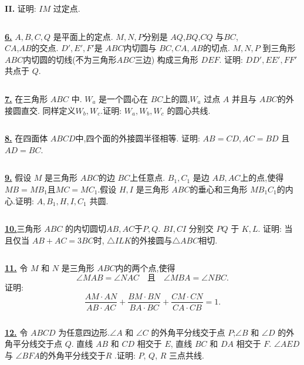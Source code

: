 \documentclass{article}
\begin{document}
{\bf II.} 证明: $ IM$ 过定点.

$$ $$

\href{http://www.artofproblemsolving.com/Forum/viewtopic.php?p=1385932#p1385932}{\bf 6.}  $ A,B,C,Q$ 是平面上的定点. $ M,N,P$分别是 $ AQ$,$BQ$,$CQ$ 与$ BC$,\\$CA$,$AB$的交点. $ D',E',F'$是 $ ABC$内切圆与 $ BC,CA,AB$的切点. $ M,N,P$ 到三角形 $ ABC$内切圆的切线(不为三角形$ ABC$三边) 构成三角形 $ DEF$. 证明: $ DD',EE',FF'$ 共点于 $ Q$.

$$ $$

\href{http://www.artofproblemsolving.com/Forum/viewtopic.php?p=1385593#p1385593}{\bf 7.} 在三角形 $ ABC$ 中. $ W_a$ 是一个圆心在 $ BC$上的圆,$ W_a$ 过点 $ A$ 并且与 $ ABC$的外接圆直交. 同样定义$ W_b,W_c$.证明: $ W_a,W_b,W_c$ 的圆心共线.

$$ $$

\href{http://www.artofproblemsolving.com/Forum/viewtopic.php?p=1385555#p1385555}{\bf 8.} 在四面体 $ABCD$中,四个面的外接圆半径相等. 证明: $AB=CD, AC=BD$ 且 $AD=BC$.

$$ $$

\href{http://www.artofproblemsolving.com/Forum/viewtopic.php?p=1385585#p1385585}{\bf 9.} 假设 $ M$ 是三角形 $ ABC$的边 $ BC$上任意点. $ B_1,C_1$ 是边 $ AB,AC$上的点,使得$ MB = MB_1$且$ MC = MC_1$.假设 $ H,I$ 是三角形 $ ABC$的垂心和三角形 $ MB_1C_1$的内心.证明: $ A,B_1,H,I,C_1$ 共圆.

$$ $$

\href{http://www.artofproblemsolving.com/Forum/viewtopic.php?p=1370723#p1370723}{\bf 10.}三角形 $ ABC$ 的内切圆切$ AB,AC$于$ P,Q$. $ BI, CI$ 分别交 $ PQ$ 于 $ K,L$. 证明: 当且仅当 $ AB+AC=3BC$时, $\triangle ILK$的外接圆与$\triangle ABC$相切.

$$ $$

\href{http://www.artofproblemsolving.com/Forum/viewtopic.php?p=124397#p124397}{\bf 11.} 令 $ M$ 和 $ N$ 是三角形 $ ABC$内的两个点,使得
$$ \angle MAB = \angle NAC\quad \mbox{且}\quad \angle MBA = \angle NBC.$$
证明:
$$ \frac {AM \cdot AN}{AB \cdot AC} + \frac {BM \cdot BN}{BA \cdot BC} + \frac {CM \cdot CN}{CA \cdot CB} = 1.$$

$$ $$

\href{http://www.artofproblemsolving.com/Forum/viewtopic.php?p=191489#p191489}{\bf 12.} 令 $ABCD$ 为任意四边形.$\angle A$ 和 $\angle C$ 的外角平分线交于点 $P$;$\angle B$ 和 $\angle D$ 的外角平分线交于点 $Q$. 直线 $AB$ 和 $CD$ 相交于 $E$, 直线 $BC$ 和 $DA$ 相交于 $F$.  $\angle{AED}$与 $\angle{BFA}$的外角平分线交于$R$ .证明: $P$, $Q$, $R$ 三点共线.
\end{document}
